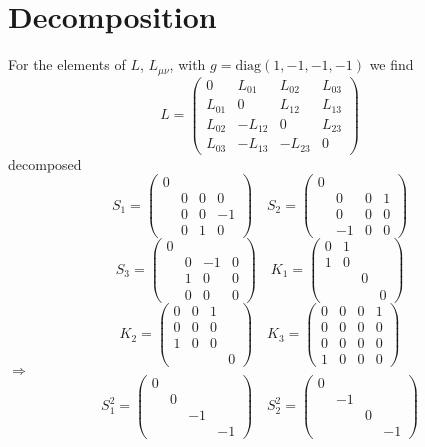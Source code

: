 \documentclass{article}
\begin{document}
	\section*{Decomposition}
	For the elements of $L$, $L_{\mu\nu}$, with $g = \text{diag}(1,-1,-1,-1)$
	we find
	\[ L =
	\begin{pmatrix}
		0 & L_{01} & L_{02} & L_{03} \\
		L_{01} & 0 & L_{12} & L_{13} \\
		L_{02} & -L_{12} & 0 & L_{23} \\
		L_{03} & -L_{13} & -L_{23} & 0
	\end{pmatrix}
	\]
	decomposed
	\[ S_1 = \begin{pmatrix}
		0 & & & \\
		& 0 & 0 & 0 \\
		& 0 & 0 & -1 \\
		& 0 & 1 & 0
	\end{pmatrix}
	\quad
	S_2 = \begin{pmatrix}
		0 & & & \\
		& 0 & 0 & 1 \\
		& 0 & 0 & 0 \\
		& -1 & 0 & 0
	\end{pmatrix}
	\]
	\[ S_3 = \begin{pmatrix}
		0 & & & \\
		& 0 & -1 & 0 \\
		& 1 & 0 & 0 \\
		& 0 & 0 & 0
	\end{pmatrix}
	\quad
	K_1 = \begin{pmatrix}
		0 & 1 & & \\
		1 & 0 & & \\
		& & 0 & \\
		& & & 0
	\end{pmatrix}
	\]
	\[ K_2 = \begin{pmatrix}
		0 & 0 & 1 & \\
		0 & 0 & 0 & \\
		1 & 0 & 0 & \\
		& & & 0
	\end{pmatrix}
	\quad
	K_3 = \begin{pmatrix}
		0 & 0 & 0 & 1 \\
		0 & 0 & 0 & 0 \\
		0 & 0 & 0 & 0 \\
		1 & 0 & 0 & 0
	\end{pmatrix}
	\]
	$\Rightarrow$
	\[ S_1^2 = \begin{pmatrix}
		0 & & & \\
		& 0 & & \\
		& & -1 & \\
		& & & -1
	\end{pmatrix}
	\quad
	S_2^2 = \begin{pmatrix}
		0 & & & \\
		& -1 & & \\
		& & 0 & \\
		& & & -1
	\end{pmatrix}
	\]
\end{document}
